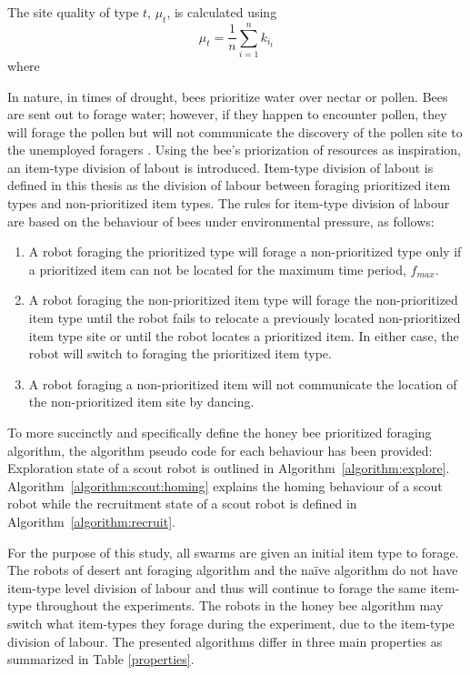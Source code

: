 The site quality of type $t$, $\mu_t$, is calculated using
\begin{equation}
\label{density}
\mu_t = \frac{1}{n}\sum\limits_{i=1}^n k_{i_t}
\end{equation}
where 

In nature, in times of drought, bees prioritize water over nectar or pollen. Bees are sent out to forage water; however, if they happen to encounter pollen, they will forage the pollen but will not communicate the discovery of the pollen site to the unemployed foragers  \cite{seeley2009wisdom}. Using the bee's priorization of resources as inspiration, an item-type division of labout is introduced. Item-type division of labout is defined in this thesis as the division of labour between foraging prioritized item types and non-prioritized item types.
The rules for item-type division of labour are based on the behaviour of bees under environmental pressure, as follows:

\begin{enumerate}
\item A robot foraging the prioritized type will forage a non-prioritized type only if a prioritized item can not be located for the maximum time period, $f_{max}$.
\item A robot foraging the non-prioritized item type will forage the non-prioritized item type until the robot fails to relocate a previously located non-prioritized item type site or until the robot locates a prioritized item. In either case, the robot will switch to foraging the prioritized item type.
\item A robot foraging a non-prioritized item will not communicate the location of the non-prioritized item site by dancing. 
\end{enumerate}

To more succinctly and specifically define the honey bee prioritized foraging algorithm, the algorithm pseudo code for each behaviour has been provided: Exploration state of a scout robot is outlined in Algorithm~\ref{algorithm:explore}. Algorithm~\ref{algorithm:scout:homing} explains the homing behaviour of a scout robot while the recruitment state of a scout robot is defined in Algorithm~\ref{algorithm:recruit}. 

For the purpose of this study, all swarms are given an initial item type to forage. The robots of desert ant foraging algorithm and the na\"ive algorithm do not have item-type level division of labour and thus will continue to forage the same item-type throughout the experiments. The robots in the honey bee algorithm may switch what item-types they forage during the experiment, due to the item-type division of labour. The presented algorithms differ in three main properties as summarized in Table \ref{properties}.

